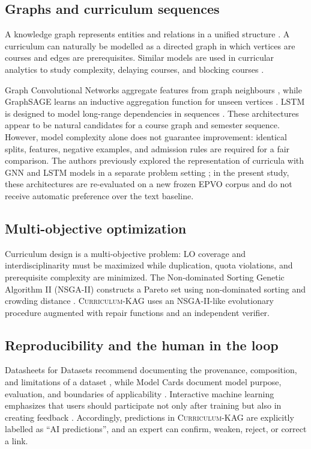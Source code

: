 \documentclass[twoside,11pt]{article}
\newcommand{\systemname}{\textsc{Curriculum-KAG}}
\begin{document}
\subsection{Graphs and curriculum sequences}

A knowledge graph represents entities and relations in a unified structure \cite{Hogan2021}. A curriculum can naturally be modelled as a directed graph in which vertices are courses and edges are prerequisites. Similar models are used in curricular analytics to study complexity, delaying courses, and blocking courses \cite{Heileman2018}.

Graph Convolutional Networks aggregate features from graph neighbours \cite{Kipf2017}, while GraphSAGE learns an inductive aggregation function for unseen vertices \cite{Hamilton2017}. LSTM is designed to model long-range dependencies in sequences \cite{Hochreiter1997}. These architectures appear to be natural candidates for a course graph and semester sequence. However, model complexity alone does not guarantee improvement: identical splits, features, negative examples, and admission rules are required for a fair comparison. The authors previously explored the representation of curricula with GNN and LSTM models in a separate problem setting \cite{Kozhanov2025}; in the present study, these architectures are re-evaluated on a new frozen EPVO corpus and do not receive automatic preference over the text baseline.

\subsection{Multi-objective optimization}

Curriculum design is a multi-objective problem: LO coverage and interdisciplinarity must be maximized while duplication, quota violations, and prerequisite complexity are minimized. The Non-dominated Sorting Genetic Algorithm II (NSGA-II) constructs a Pareto set using non-dominated sorting and crowding distance \cite{Deb2002}. \systemname{} uses an NSGA-II-like evolutionary procedure augmented with repair functions and an independent verifier.

\subsection{Reproducibility and the human in the loop}

Datasheets for Datasets recommend documenting the provenance, composition, and limitations of a dataset \cite{Gebru2021}, while Model Cards document model purpose, evaluation, and boundaries of applicability \cite{Mitchell2019}. Interactive machine learning emphasizes that users should participate not only after training but also in creating feedback \cite{Amershi2014}. Accordingly, predictions in \systemname{} are explicitly labelled as ``AI predictions'', and an expert can confirm, weaken, reject, or correct a link.
\end{document}
